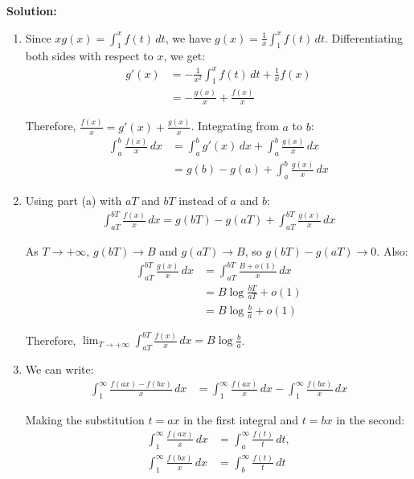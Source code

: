 \bigskip\noindent\textbf{Solution:}
\begin{enumerate}[label=(\alph*)]
\item Since $xg(x) = \int_{1}^{x} f(t) \, dt$, we have $g(x) = \frac{1}{x} \int_{1}^{x} f(t) \, dt$. Differentiating both sides with respect to $x$, we get:
\begin{align*}
g'(x) &= -\frac{1}{x^2} \int_{1}^{x} f(t) \, dt + \frac{1}{x} f(x) \\
&= -\frac{g(x)}{x} + \frac{f(x)}{x}
\end{align*}

Therefore, $\frac{f(x)}{x} = g'(x) + \frac{g(x)}{x}$. Integrating from $a$ to $b$:
\begin{align*}
\int_{a}^{b} \frac{f(x)}{x} \, dx &= \int_{a}^{b} g'(x) \, dx + \int_{a}^{b} \frac{g(x)}{x} \, dx \\
&= g(b) - g(a) + \int_{a}^{b} \frac{g(x)}{x} \, dx
\end{align*}

\item Using part (a) with $aT$ and $bT$ instead of $a$ and $b$:
\begin{align*}
\int_{aT}^{bT} \frac{f(x)}{x} \, dx = g(bT) - g(aT) + \int_{aT}^{bT} \frac{g(x)}{x} \, dx
\end{align*}

As $T \to +\infty$, $g(bT) \to B$ and $g(aT) \to B$, so $g(bT) - g(aT) \to 0$. Also:
\begin{align*}
\int_{aT}^{bT} \frac{g(x)}{x} \, dx &= \int_{aT}^{bT} \frac{B + o(1)}{x} \, dx \\
&= B \log \frac{bT}{aT} + o(1) \\
&= B \log \frac{b}{a} + o(1)
\end{align*}

Therefore, $\lim_{T \to +\infty} \int_{aT}^{bT} \frac{f(x)}{x} \, dx = B \log \frac{b}{a}$.

\item We can write:
\begin{align*}
\int_{1}^{\infty} \frac{f(ax) - f(bx)}{x} \, dx &= \int_{1}^{\infty} \frac{f(ax)}{x} \, dx - \int_{1}^{\infty} \frac{f(bx)}{x} \, dx
\end{align*}

Making the substitution $t = ax$ in the first integral and $t = bx$ in the second:
\begin{align*}
\int_{1}^{\infty} \frac{f(ax)}{x} \, dx &= \int_{a}^{\infty} \frac{f(t)}{t} \, dt, \\
\int_{1}^{\infty} \frac{f(bx)}{x} \, dx &= \int_{b}^{\infty} \frac{f(t)}{t} \, dt
\end{align*}


\end{enumerate}
